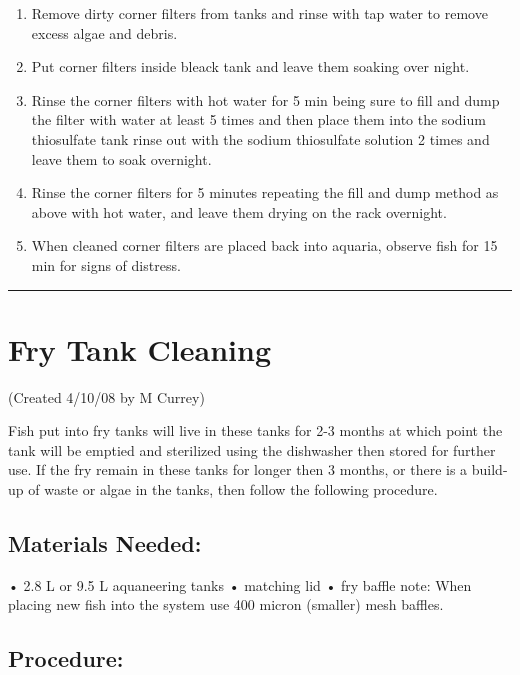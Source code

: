 \documentclass[
]{book}
\providecommand{\tightlist}{%
  \setlength{\itemsep}{0pt}\setlength{\parskip}{0pt}}
\begin{document}
\begin{enumerate}
\def\labelenumi{\arabic{enumi}.}
\tightlist
\item
  Remove dirty corner filters from tanks and rinse with tap water to remove excess algae and debris.
\item
  Put corner filters inside bleack tank and leave them soaking over night.
\item
  Rinse the corner filters with hot water for 5 min being sure to fill and dump the filter with water at least 5 times and then place them into the sodium thiosulfate tank rinse out with the sodium thiosulfate solution 2 times and leave them to soak overnight.
\item
  Rinse the corner filters for 5 minutes repeating the fill and dump method as above with hot water, and leave them drying on the rack overnight.
\item
  When cleaned corner filters are placed back into aquaria, observe fish for 15 min for signs of distress.
\end{enumerate}

\begin{center}\rule{0.5\linewidth}{0.5pt}\end{center}

\hypertarget{fry-tank-cleaning}{%
\section{Fry Tank Cleaning}\label{fry-tank-cleaning}}

(Created 4/10/08 by M Currey)

Fish put into fry tanks will live in these tanks for 2-3 months at which point the tank will be emptied and sterilized using the dishwasher then stored for further use. If the fry remain in these tanks for longer then 3 months, or there is a build-up of waste or algae in the tanks, then follow the following procedure.

\hypertarget{materials-needed-3}{%
\subsection{Materials Needed:}\label{materials-needed-3}}

• 2.8 L or 9.5 L aquaneering tanks
• matching lid
• fry baffle note: When placing new fish into the system use 400 micron (smaller) mesh baffles.

\hypertarget{procedure-8}{%
\subsection{Procedure:}\label{procedure-8}}
\end{document}
